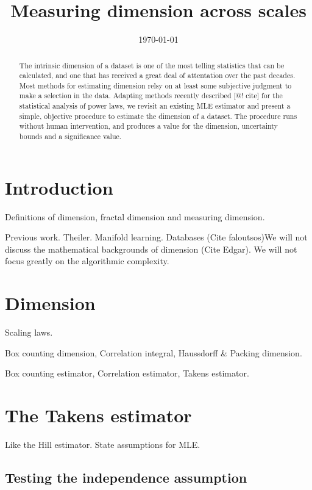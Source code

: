 \documentclass{article}
\title{Measuring dimension across scales}
\date{\today}
\begin{document}
\maketitle

\begin{abstract}
The intrinsic dimension of a dataset is one of the most telling statistics that can be calculated, and one that has received a great deal of attentation over the past decades. Most methods for estimating dimension relsy on at least some subjective judgment to make a selection in the data. Adapting methods recently described [@! cite] for the statistical analysis of power laws, we revisit an existing MLE estimator and present a simple, objective procedure to estimate the dimension of a dataset. The procedure runs without human intervention, and produces a value for the dimension, uncertainty bounds and a significance value.\end{abstract}

\section{Introduction}

Definitions of dimension, fractal dimension and measuring dimension.

Previous work. Theiler. Manifold learning. Databases (Cite faloutsos)We will not discuss the mathematical backgrounds of dimension (Cite Edgar). We will not focus greatly on the algorithmic complexity.

\section{Dimension}

Scaling laws.

Box counting dimension, Correlation integral, Haussdorff & Packing dimension.

Box counting estimator, Correlation estimator, Takens estimator.

\section{The Takens estimator}

Like the Hill estimator. State assumptions for MLE. 

\subsection{Testing the independence assumption}
\end{document}
